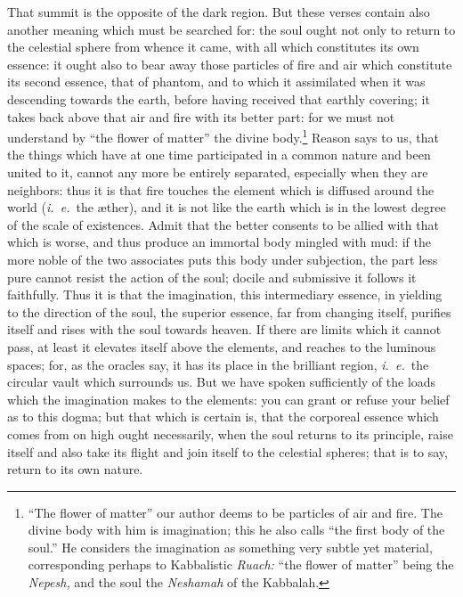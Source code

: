 \documentclass[12pt]{article}
\begin{document}
\noindent That summit is the opposite of the dark region. But these verses
contain also another meaning which must be searched for: the soul ought not
only to return to the celestial sphere from whence it came, with all which
constitutes its own essence: it ought also to bear away those particles of fire
and air which constitute its second essence, that of phantom, and to which it
assimilated when it was descending towards the earth, before having received
that earthly covering; it takes back above that air and fire with its better
part: for we must not understand by ``the flower of matter'' the divine
body.\footnote{``The flower of matter'' our author deems to be particles of air
and fire. The divine body with him is imagination; this he also calls ``the
first body of the soul.'' He considers the imagination as something very subtle
yet material, corresponding perhaps to Kabbalistic \textit{Ruach:} ``the flower
of matter'' being the \textit{Nepesh,} and the soul the \textit{Neshamah} of
the Kabbalah.} Reason says to us, that the things which have at one time
participated in a common nature and been united to it, cannot any more be
entirely separated, especially when they are neighbors: thus it is that fire
touches the element which is diffused around the world (\textit{i.~e.}~the
{\ae}ther), and it is not like the earth which is in the lowest degree of the
scale of existences.  Admit that the better consents to be allied with that
which is worse, and thus produce an immortal body mingled with mud: if the more
noble of the two associates puts this body under subjection, the part less pure
cannot resist the action of the soul; docile and submissive it follows it
faithfully. Thus it is that the imagination, this intermediary essence, in
yielding to the direction of the soul, the superior essence, far from changing
itself, purifies itself and rises with the soul towards heaven. If there are
limits which it cannot pass, at least it elevates itself above the elements,
and reaches to the luminous spaces; for, as the oracles say, it has its place
in the brilliant region, \textit{i.~e.}~the circular vault which surrounds us.
But we have spoken sufficiently of the loads which the imagination makes to the
elements: you can grant or refuse your belief as to this dogma; but that which
is certain is, that the corporeal essence which comes from on high ought
necessarily, when the soul returns to its principle, raise itself and also take
its flight and join itself to the celestial spheres; that is to say, return to
its own nature.
\end{document}
